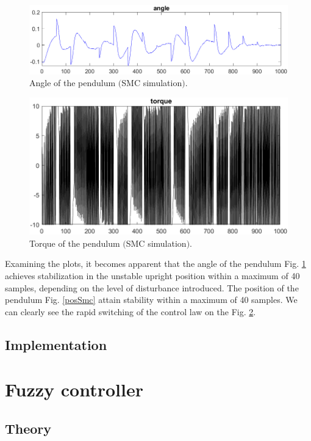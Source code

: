 \begin{figure}[!tbh]
	\centering
	\includegraphics[width=150mm]{obr/angSmc.png}
	\caption{Angle of the pendulum $($SMC simulation$)$.}\label{angSmc}
\end{figure}

\begin{figure}[!tbh]
	\centering
	\includegraphics[width=150mm]{obr/torSmc.png}
	\caption{Torque of the pendulum $($SMC simulation$)$.}\label{torSmc}
\end{figure}

Examining the plots, it becomes apparent that the angle of the pendulum Fig. \ref{angSmc} achieves stabilization in the unstable upright position within a maximum of 40 samples, depending on the level of disturbance introduced. The position of the pendulum Fig. \ref{posSmc} attain stability within a maximum of 40 samples. We can clearly see the rapid switching of the control law on the Fig. \ref{torSmc}. 

\subsection{Implementation}

\newpage
\section{Fuzzy controller}
\subsection{Theory}

